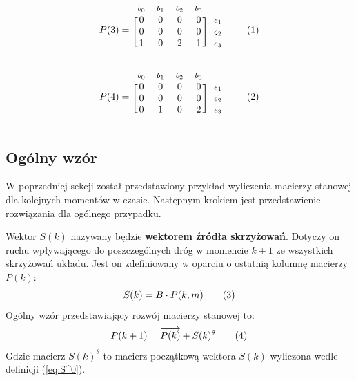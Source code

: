 \documentclass[12pt]{book}
\theoremstyle{plain}
\newcommand\addtag{\refstepcounter{equation}
\renewcommand{\labelenumii}{\theenumii}
\renewcommand{\theenumii}{\theenumi.\arabic{enumii}.}
\tag{\theequation}}
\begin{document}
\begin{equation*}
  P(3)=
  \begin{blockarray}{*{4}{c} l}
    \begin{block}{*{4}{>{$\footnotesize}c<{$}} l}
      $b_0$ & $b_1$ & $b_2$ & $b_3$ \\
    \end{block}
    \begin{block}{[*{4}{c}]>{$\footnotesize}l<{$}}
       0 & 0 & 0 & 0 & $e_1$ \\
       0 & 0 & 0 & 0 & $e_2$ \\
       1 & 0 & 2 & 1 & $e_3$ \\
    \end{block}
  \end{blockarray} \addtag
\end{equation*}

\begin{equation*}
  P(4)=
  \begin{blockarray}{*{4}{c} l}
    \begin{block}{*{4}{>{$\footnotesize}c<{$}} l}
     $b_0$ & $b_1$ & $b_2$ & $b_3$ \\
    \end{block}
    \begin{block}{[*{4}{c}]>{$\footnotesize}l<{$}}
       0 & 0 & 0 & 0 & $e_1$ \\
       0 & 0 & 0 & 0 & $e_2$ \\
       0 & 1 & 0 & 2 & $e_3$ \\
    \end{block}
  \end{blockarray} \addtag
\end{equation*}

\subsection{Ogólny wzór}
W poprzedniej sekcji został przedstawiony przykład wyliczenia macierzy stanowej dla kolejnych momentów w czasie. Następnym krokiem jest przedstawienie rozwiązania dla ogólnego przypadku. \\ 

\begin{tcolorbox}


Wektor $S(k)$ nazywany będzie \textbf{wektorem źródła skrzyżowań}. Dotyczy on ruchu wpływającego do poszczególnych dróg w momencie $k+1$ ze wszystkich skrzyżowań układu. Jest on zdefiniowany w oparciu o ostatnią kolumnę macierzy $P(k)$:
\[S(k)=B\cdot P(k,m) \addtag \label{eq:S} \]
Ogólny wzór przedstawiający rozwój macierzy stanowej to:
\[P(k+1)=\overrightarrow{P(k)} + {S(k)^\theta} \addtag \label{eq:P}
\]
Gdzie macierz $S(k)^{\theta}$ to macierz początkową wektora $S(k)$ wyliczona wedle definicji (\ref{eq:S^0}).
\end{tcolorbox} \noindent
\end{document}
